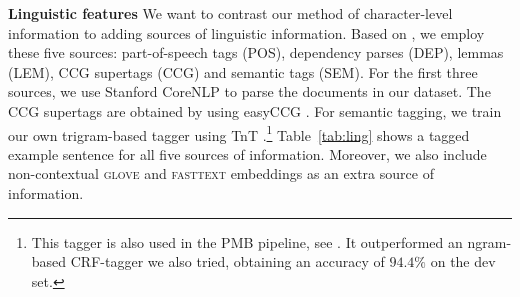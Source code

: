 \documentclass[11pt,a4paper]{article}
\newcommand{\glove}{\textsc{glove}}
\newcommand{\fasttext}{\textsc{fasttext}}
\newcommand{\inlineheader}[1]{\vspace{0.06cm}
\noindent\textbf{#1}\quad
}
\begin{document}
\begin{table}[!t]
\centering
\setlength{\tabcolsep}{4pt}
\caption{Number of documents for the four languages, for the two PMB releases considered.\label{tab:releases}}
\end{table}


\inlineheader{Linguistic features} We want to contrast our method of character-level information to adding sources of linguistic information. Based on \citet{van-noord-etal-2019-linguistic}, we employ these five sources: part-of-speech tags (POS), dependency parses (DEP), lemmas (LEM), CCG supertags (CCG) and semantic tags (SEM). For the first three sources, we use Stanford CoreNLP \citep{manning2014stanford} to parse the documents in our dataset. The CCG supertags are obtained by using easyCCG \citep{lewisSteedman:14}. For semantic tagging, we train our own trigram-based tagger using TnT \citep{Brants:2000}.\footnote{This tagger is also used in the PMB pipeline, see \citet{semantic-tagset:17}. It outperformed an ngram-based CRF-tagger \citep{crf:01} we also tried, obtaining an accuracy of $94.4\%$ on the dev set.} Table~\ref{tab:ling} shows a tagged example sentence for all five sources of information. Moreover, we also include non-contextual \glove{} and \fasttext{} embeddings as an extra source of information.
\end{document}
